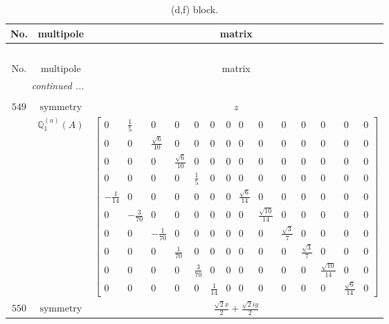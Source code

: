 \documentclass[fleqn,8pt,landscape]{jsarticle}
\begin{document}
\begin{longtable}{ccc}
\caption{(d,f) block.}
 \\
 \hline \hline
No. & multipole & matrix \\ \hline \endfirsthead

\multicolumn{2}{l}{\tablename\ \thetable{}} \\
 \hline \hline
No. & multipole & matrix \\ \hline \endhead

 \hline \hline
\multicolumn{2}{r}{\footnotesize\it continued ...} \\ \endfoot

 \hline \hline
\multicolumn{2}{r}{} \\ \endlastfoot

$ 549 $ & $ \text{symmetry} $ & $ z $ \\
$  $ & $ \mathbb{Q}_{1}^{(a)}(A) $ & $ \begin{bmatrix} 0 & \frac{1}{5} & 0 & 0 & 0 & 0 & 0 & 0 & 0 & 0 & 0 & 0 & 0 & 0 \\ 0 & 0 & \frac{\sqrt{6}}{10} & 0 & 0 & 0 & 0 & 0 & 0 & 0 & 0 & 0 & 0 & 0 \\ 0 & 0 & 0 & \frac{\sqrt{6}}{10} & 0 & 0 & 0 & 0 & 0 & 0 & 0 & 0 & 0 & 0 \\ 0 & 0 & 0 & 0 & \frac{1}{5} & 0 & 0 & 0 & 0 & 0 & 0 & 0 & 0 & 0 \\ - \frac{1}{14} & 0 & 0 & 0 & 0 & 0 & 0 & \frac{\sqrt{6}}{14} & 0 & 0 & 0 & 0 & 0 & 0 \\ 0 & - \frac{3}{70} & 0 & 0 & 0 & 0 & 0 & 0 & \frac{\sqrt{10}}{14} & 0 & 0 & 0 & 0 & 0 \\ 0 & 0 & - \frac{1}{70} & 0 & 0 & 0 & 0 & 0 & 0 & \frac{\sqrt{3}}{7} & 0 & 0 & 0 & 0 \\ 0 & 0 & 0 & \frac{1}{70} & 0 & 0 & 0 & 0 & 0 & 0 & \frac{\sqrt{3}}{7} & 0 & 0 & 0 \\ 0 & 0 & 0 & 0 & \frac{3}{70} & 0 & 0 & 0 & 0 & 0 & 0 & \frac{\sqrt{10}}{14} & 0 & 0 \\ 0 & 0 & 0 & 0 & 0 & \frac{1}{14} & 0 & 0 & 0 & 0 & 0 & 0 & \frac{\sqrt{6}}{14} & 0 \end{bmatrix} $ \\ \hline
$ 550 $ & $ \text{symmetry} $ & $ \frac{\sqrt{2} x}{2} + \frac{\sqrt{2} i y}{2} $ \\

\end{longtable}
\end{document}
